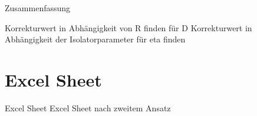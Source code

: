 Zusammenfassung

Korrekturwert in Abhängigkeit von R finden für D
Korrekturwert in Abhängigkeit der Isolatorparameter  für eta finden

\section{Excel Sheet}

Excel Sheet
	Excel Sheet nach zweitem Ansatz

\pagebreak